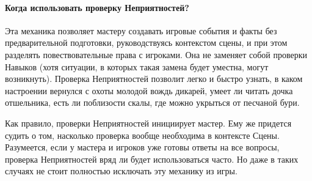 \paragraph{Когда использовать проверку Неприятностей?} Эта механика позволяет мастеру создавать игровые события и факты без предварительной подготовки, руководствуясь контекстом сцены, и при этом разделять повествовательные права с игроками. Она не заменяет собой проверки Навыков (хотя ситуации, в которых такая замена будет уместна, могут возникнуть). Проверка Неприятностей позволит легко и быстро узнать, в каком настроении вернулся с охоты молодой вождь дикарей, умеет ли читать дочка отшельника, есть ли поблизости скалы, где можно укрыться от песчаной бури.
\begin{tcolorbox}
Как правило, проверки Неприятностей инициирует мастер. Ему же придется судить о том, насколько проверка вообще необходима в контексте Сцены. Разумеется, если у мастера и игроков уже готовы ответы на все вопросы, проверка Неприятностей вряд ли будет использоваться часто. Но даже в таких случаях не стоит полностью исключать эту механику из игры.
\end{tcolorbox}